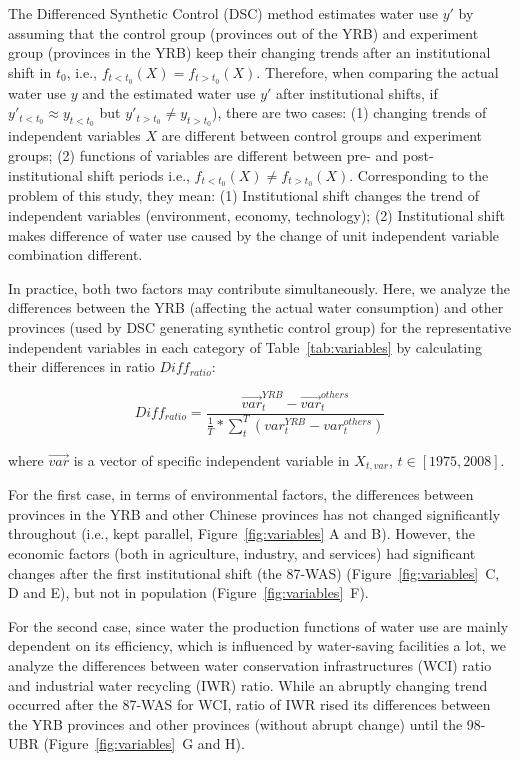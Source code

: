 \graphicspath{{../../../figs/}}

The Differenced Synthetic Control (DSC) method estimates water use $y'$ by assuming that the control group (provinces out of the YRB) and experiment group (provinces in the YRB) keep their changing trends after an institutional shift in $t_0$, i.e., $f_{t<t_0}(X) = f_{t>t_0}(X)$.
Therefore, when comparing the actual water use $y$ and the estimated water use $y'$ after institutional shifts, if $y'_{t<t_0} \approx y_{t<t_0}$ but $y'_{t>t_0} \neq y_{t>t_0}$), there are two cases: (1) changing trends of independent variables $X$ are different between control groups and experiment groups; (2) functions of variables are different between pre- and post- institutional shift periods i.e., $f_{t<t_0}(X) \neq f_{t>t_0}(X)$.
Corresponding to the problem of this study, they mean: (1) Institutional shift changes the trend of independent variables (environment, economy, technology); (2) Institutional shift makes difference of water use caused by the change of unit independent variable combination different.

In practice, both two factors may contribute simultaneously.
Here, we analyze the differences between the YRB (affecting the actual water consumption) and other provinces (used by DSC generating synthetic control group) for the representative independent variables in each category of Table~\ref{tab:variables} by calculating their differences in ratio $Diff_{ratio}$:

\begin{equation}
    Diff_{ratio} = \frac{\vec{var}^{YRB}_{t} - \vec{var}^{others}_{t}}{\frac{1}{T} * \sum_{t}^T (var^{YRB}_{t} - var^{others}_{t})}
\end{equation}

where $\vec{var}$ is a vector of specific independent variable in $X_{t, var}$, $t\in [1975, 2008]$.

For the first case, in terms of environmental factors, the differences between provinces in the YRB and other Chinese provinces has not changed significantly throughout (i.e., kept parallel, Figure~\ref{fig:variables} A and B). However, the economic factors (both in agriculture, industry, and services) had significant changes after the first institutional shift (the 87-WAS) (Figure~\ref{fig:variables}~C, D and E), but not in population (Figure~\ref{fig:variables}~F).

For the second case, since water the production functions of water use are mainly dependent on its efficiency, which is influenced by water-saving facilities a lot, we analyze the differences between water conservation infrastructures (WCI) ratio and industrial water recycling (IWR) ratio. While an abruptly changing trend occurred after the 87-WAS for WCI, ratio of IWR rised its differences between the YRB provinces and other provinces (without abrupt change) until the 98-UBR (Figure~\ref{fig:variables}~G and H).

